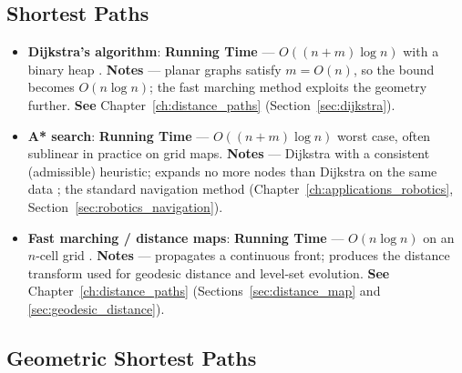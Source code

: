\subsection{Shortest Paths}
\label{sec:appalgs_graphs_shortest}

\begin{itemize}
  \item \textbf{Dijkstra's algorithm}:
    \textbf{Running Time} --- $O((n+m)\log n)$ with a binary heap
    \cite{dijkstra1959, cormen2009}. \textbf{Notes} --- planar graphs
    satisfy $m = O(n)$, so the bound becomes $O(n\log n)$; the fast
    marching method exploits the geometry further. \textbf{See}
    Chapter~\ref{ch:distance_paths} (Section~\ref{sec:dijkstra}).
  \item \textbf{A* search}: \textbf{Running Time} ---
    $O((n+m)\log n)$ worst case, often sublinear in practice on grid maps.
    \textbf{Notes} --- Dijkstra with a consistent (admissible) heuristic;
    expands no more nodes than Dijkstra on the same data \cite{hart1968};
    the standard navigation method (Chapter~\ref{ch:applications_robotics},
    Section~\ref{sec:robotics_navigation}).
  \item \textbf{Fast marching / distance maps}:
    \textbf{Running Time} --- $O(n\log n)$ on an $n$-cell grid
    \cite{sethian1996}. \textbf{Notes} --- propagates a continuous front;
    produces the distance transform used for geodesic distance and level-set
    evolution. \textbf{See} Chapter~\ref{ch:distance_paths}
    (Sections~\ref{sec:distance_map} and \ref{sec:geodesic_distance}).
\end{itemize}

\subsection{Geometric Shortest Paths}
\label{sec:appalgs_graphs_paths}

